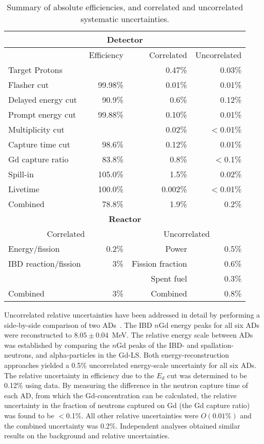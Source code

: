 \documentclass[aps,prl,showpacs,showkeys,amsmath,amssymb,
twocolumn,
floatfix,
superscriptaddress
]{revtex4-1}
\begin{document}
\begin{table}[!htb]
\begin{center}
\begin{tabular}{lrrr}
\hline
\hline
\multicolumn{4}{c}{\bf Detector} \\\hline
  & Efficiency & Correlated & Uncorrelated \\ \hline
Target Protons  &     & 0.47\% & 0.03\%  \\
Flasher cut & 99.98\% & 0.01\% & 0.01\% \\
Delayed energy cut & 90.9\% & 0.6\% & 0.12\%    \\
Prompt energy cut  & 99.88\% & 0.10\%  & 0.01\%  \\
Multiplicity cut & & 0.02\% & $<$0.01\% \\
Capture time cut  & 98.6\% & 0.12\%  &  0.01\%  \\
Gd capture ratio  & 83.8\% & 0.8\% & $<$0.1\%  \\
Spill-in     & 105.0\% & 1.5\% & 0.02\%    \\
Livetime & 100.0\% & 0.002\% & $<$0.01\% \\

\hline
Combined & 78.8\% & 1.9\% & 0.2\% \\

\hline
\hline
 \multicolumn{4}{c}{\bf Reactor} \\\hline
 \multicolumn{2}{c|}{Correlated} & \multicolumn{2}{c}{Uncorrelated} \\\hline
Energy/fission & 0.2\%  & Power  & 0.5\% \\
IBD reaction/fission & 3\%  & Fission fraction & 0.6\% \\
&& Spent fuel & 0.3\% \\
\hline
Combined & 3\%  & Combined  & 0.8\% \\\hline

\end{tabular}
\caption{Summary of absolute efficiencies, and correlated and uncorrelated systematic uncertainties. \label{tab:eff}}
\end{center}
\end{table}

\par
Uncorrelated relative uncertainties have been addressed in detail by performing a side-by-side comparison of two ADs~\cite{ad12}. The IBD $n$Gd energy peaks for all six ADs were reconstructed to $8.05\pm 0.04$~MeV\@. The relative energy scale between ADs was established by comparing the $n$Gd peaks of the IBD- and spallation-neutrons, and alpha-particles in the Gd-LS\@.
Both energy-reconstruction approaches yielded a 0.5\% uncorrelated energy-scale uncertainty for all six ADs. The relative uncertainty in efficiency due to the $E_d$ cut was determined to be 0.12\% using data.
By measuring the difference in the neutron capture time of each AD, from which
the Gd-concentration can be calculated, the relative uncertainty in the fraction of neutrons captured on Gd (the Gd capture ratio) was found to be
$<$0.1\%. All other relative uncertainties were $O(0.01\%)$ and the combined uncertainty was 0.2\%. Independent analyses obtained similar results on the background and relative uncertainties.
\end{document}

